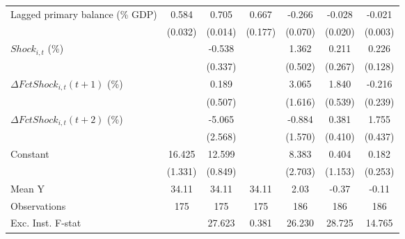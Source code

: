 {\begin{tabular}{l*{6}{c}}
\addlinespace
Lagged primary balance (\% GDP)&       0.584\sym{***}&       0.705\sym{***}&       0.667\sym{***}&      -0.266\sym{***}&      -0.028         &      -0.021\sym{***}\\
                    &     (0.032)         &     (0.014)         &     (0.177)         &     (0.070)         &     (0.020)         &     (0.003)         \\
\addlinespace
$ Shock_{i,t}$ (\%) &                     &      -0.538         &                     &       1.362\sym{**} &       0.211         &       0.226         \\
                    &                     &     (0.337)         &                     &     (0.502)         &     (0.267)         &     (0.128)         \\
\addlinespace
$ \Delta FctShock_{i,t}(t+1)$ (\%)&                     &       0.189         &                     &       3.065\sym{*}  &       1.840\sym{***}&      -0.216         \\
                    &                     &     (0.507)         &                     &     (1.616)         &     (0.539)         &     (0.239)         \\
\addlinespace
$ \Delta FctShock_{i,t}(t+2)$ (\%)&                     &      -5.065\sym{*}  &                     &      -0.884         &       0.381         &       1.755\sym{***}\\
                    &                     &     (2.568)         &                     &     (1.570)         &     (0.410)         &     (0.437)         \\
\addlinespace
Constant            &      16.425\sym{***}&      12.599\sym{***}&                     &       8.383\sym{**} &       0.404         &       0.182         \\
                    &     (1.331)         &     (0.849)         &                     &     (2.703)         &     (1.153)         &     (0.253)         \\
\midrule
Mean Y              &       34.11         &       34.11         &       34.11         &        2.03         &       -0.37         &       -0.11         \\
Observations        &         175         &         175         &         175         &         186         &         186         &         186         \\
Exc. Inst. F-stat   &                     &      27.623         &       0.381         &      26.230         &      28.725         &      14.765         \\
\bottomrule
\end{tabular}
}
